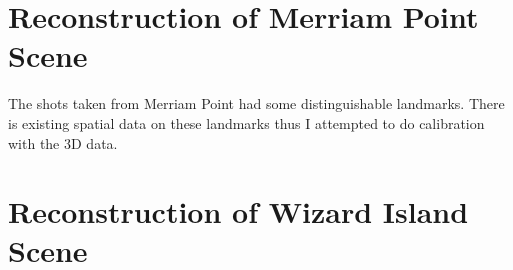 \documentclass[11pt,psfig]{article}
\begin{document}
\newpage

\section{Reconstruction of Merriam Point Scene}

The shots taken from Merriam Point had some distinguishable landmarks. There is existing spatial data on these landmarks thus I attempted to do calibration with the 3D data. 

\newpage

\section{Reconstruction of Wizard Island Scene}


\end{document}
